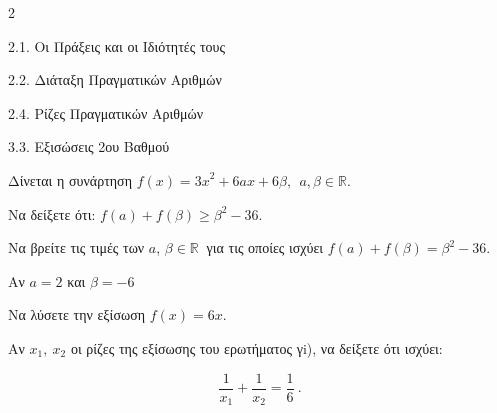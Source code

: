 \begin{ylh}{2}
    \item 2.1. Οι Πράξεις και οι Ιδιότητές τους
    \item 2.2. Διάταξη Πραγματικών Αριθμών
    \item 2.4. Ρίζες Πραγματικών Αριθμών
    \item 3.3. Εξισώσεις 2ου Βαθμού
\end{ylh}
Δίνεται η συνάρτηση $f(x) = {3x}^{2} + 6a x + 6\beta,\ \ a,\beta\mathbb{\in R}$.

\begin{alist}
\item Να δείξετε ότι: $f(a) + f(\beta) \geq \beta^{2} - 36$.
\item Να βρείτε τις τιμές των $a$, $\beta\mathbb{\in R}\ $ για τις οποίες ισχύει $f(a) + f(\beta) = \beta^{2} - 36$.
\item Αν $a = 2$ και $\beta = - 6$
\begin{rlist}
\item
  Να λύσετε την εξίσωση $f(x) = 6x$.
\item
  Αν $x_{1},\ x_{2}$ οι ρίζες της εξίσωσης του ερωτήματος γi), να δείξετε ότι ισχύει:

\begin{equation*}\dfrac{1}{x_{1}} + \dfrac{1}{x_{2}} = \dfrac{1}{6}\ .\end{equation*}
\end{rlist}
\end{alist}

